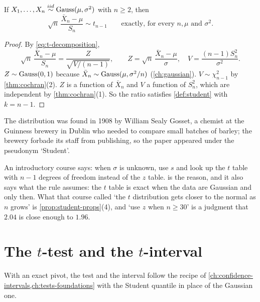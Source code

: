 \begin{theorem}
\label{thm:t-pivot}
If $X_1, \ldots, X_n \stackrel{iid}{\sim} \text{Gauss}(\mu, \sigma^2)$ with $n \geq 2$, then
\[
\sqrt{n}\,\frac{\bar{X}_n - \mu}{S_n} \sim t_{n-1} \qquad \text{exactly, for every } n, \mu \text{ and } \sigma^2.
\]
\end{theorem}

\begin{proof}
By \eqref{eq:t-decomposition},
\[
\sqrt{n}\,\frac{\bar{X}_n - \mu}{S_n} = \frac{Z}{\sqrt{V/(n-1)}}, \qquad Z = \sqrt{n}\,\frac{\bar{X}_n - \mu}{\sigma}, \quad V = \frac{(n-1)S_n^2}{\sigma^2}.
\]
$Z \sim \text{Gauss}(0,1)$ because $\bar{X}_n \sim \text{Gauss}(\mu, \sigma^2/n)$ (\cref{ch:gaussian}).
$V \sim \chi^2_{n-1}$ by \cref{thm:cochran}(2).
$Z$ is a function of $\bar{X}_n$ and $V$ a function of $S_n^2$, which are independent by \cref{thm:cochran}(1).
So the ratio satisfies \cref{def:student} with $k = n - 1$.
\end{proof}

The distribution was found in 1908 by William Sealy Gosset, a chemist at the Guinness brewery in Dublin who needed to compare small batches of barley; the brewery forbade its staff from publishing, so the paper appeared under the pseudonym `Student'.

\begin{bridge}
An introductory course says: when $\sigma$ is unknown, use $s$ and look up the $t$ table with $n - 1$ degrees of freedom instead of the $z$ table.
 is the reason, and it also says what the rule assumes: the $t$ table is exact when the data are Gaussian and only then.
What that course called `the $t$ distribution gets closer to the normal as $n$ grows' is \cref{prop:student-props}(4), and `use $z$ when $n \geq 30$' is a judgment that $2.04$ is close enough to $1.96$.
\end{bridge}

\section{The \texorpdfstring{$t$}{t}-test and the \texorpdfstring{$t$}{t}-interval}
\label{sec:t-test}

With an exact pivot, the test and the interval follow the recipe of \cref{ch:confidence-intervals,ch:tests-foundations} with the Student quantile in place of the Gaussian one.

